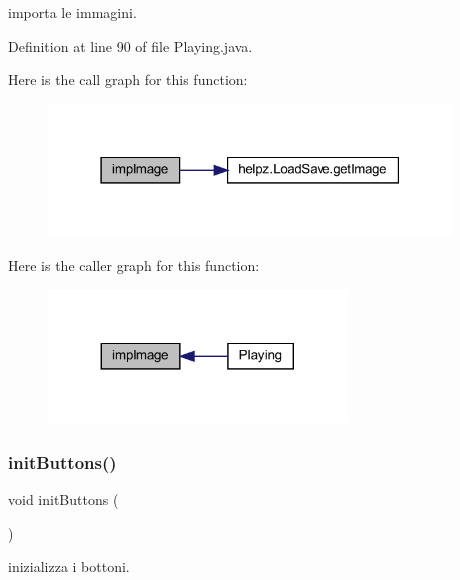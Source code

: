 importa le immagini. 



Definition at line 90 of file Playing.\+java.

Here is the call graph for this function\+:
\nopagebreak
\begin{figure}[H]
\begin{center}
\leavevmode
\includegraphics[width=303pt]{classscenes_1_1_playing_aded9c531b53772fd90d09a8b6bf0132e_cgraph}
\end{center}
\end{figure}
Here is the caller graph for this function\+:\nopagebreak
\begin{figure}[H]
\begin{center}
\leavevmode
\includegraphics[width=224pt]{classscenes_1_1_playing_aded9c531b53772fd90d09a8b6bf0132e_icgraph}
\end{center}
\end{figure}
\mbox{\label{classscenes_1_1_playing_a27d3ba5afb772cc36c9a432c28975ace}} 
\subsubsection{\texorpdfstring{init\+Buttons()}{initButtons()}}
{\footnotesize\ttfamily void init\+Buttons (\begin{DoxyParamCaption}{ }\end{DoxyParamCaption})\hspace{0.3cm}{\ttfamily [private]}}



inizializza i bottoni. 



